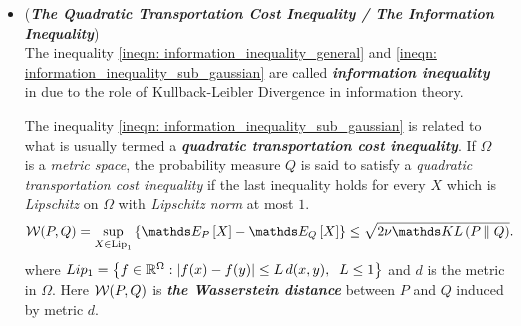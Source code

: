 \documentclass[11pt]{article}
\begin{document}
\begin{itemize}
\begin{proof}
\begin{align*}
\psi_{X - \E{}{X}}(\lambda) &\le  \phi(\lambda) &&\\
\Leftrightarrow  \lambda\paren{\E{P}{X} - \E{Q}{X}} - \kl{P}{Q}  &\le  \phi(\lambda), && \forall P\ll Q\\
\Leftrightarrow \E{P}{X} - \E{Q}{X} &\le \frac{\phi(\lambda) + \kl{P}{Q}}{\lambda}, && \forall P\ll Q, \lambda \in (0,b)\\
\Leftrightarrow \E{P}{X} - \E{Q}{X} &\le \inf_{\lambda \in (0,b)}\set{\frac{\kl{P}{Q} + \phi(\lambda)}{\lambda}} && \forall P\ll Q
\end{align*}
Note that 
\begin{align*}
\phi^{*-1}(t) = \inf_{\lambda \in (0,b)}\brac{\frac{t + \phi(\lambda)}{\lambda}}
\end{align*} Setting $t= \kl{P}{Q}$, we have
\begin{align*}
\psi_{X - \E{}{X}}(\lambda) &\le  \phi(\lambda) \\
\Leftrightarrow \E{P}{X} - \E{Q}{X} &\le  \phi^{*-1}\paren{\kl{P}{Q}}.
\end{align*} which shows that (i) is equivalent to (ii). Applying the previous result with $\phi(\lambda) = \lambda^2 \nu/2$ for every $
\lambda > 0$ leads to the stated special case of equivalence since then $\phi^{*-1}(t) = \sqrt{2\nu t}$. \qed
\end{proof}

\item \begin{remark} (\emph{\textbf{The Quadratic Transportation Cost Inequality / The Information Inequality}}) \citep{boucheron2013concentration, wainwright2019high} \\
The inequality \eqref{ineqn: information_inequality_general} and \eqref{ineqn: information_inequality_sub_gaussian} are called \emph{\textbf{information inequality}} in \citep{wainwright2019high} due to the role of Kullback-Leibler Divergence in information theory. 

The inequality  \eqref{ineqn: information_inequality_sub_gaussian} is related to what is usually termed a \emph{\textbf{quadratic transportation cost inequality}}. If $\Omega$ is a \emph{metric space}, the probability measure $Q$ is said to satisfy a \emph{quadratic transportation cost inequality} if the last inequality holds for every $X$ which is \emph{Lipschitz} on $\Omega$ with \emph{Lipschitz norm} at most $1$. 
\begin{align}
\cW(P, Q) = \sup_{X \in \text{Lip}_1}\set{\E{P}{X} - \E{Q}{X} } &\le \sqrt{2\nu\kl{P}{Q}}. \label{ineqn: information_inequality_sub_gaussian_wasserstein}
\end{align} where $Lip_1 = \left\{f \in {\mathbb R}^{\Omega}: \left\lvert f(x) - f(y) \right\rvert \le L\,d(x, y), \;\; L\le 1\right\}$ and $d$ is the metric in $\Omega$. Here ${\mathcal W}(P,Q)$ is \emph{\textbf{the Wasserstein distance}} between $P$ and $Q$ induced by metric $d$.
\end{remark}
\end{itemize}
\end{document}
